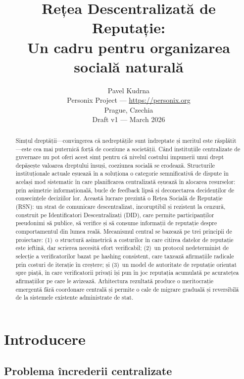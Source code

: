 \documentclass[11pt,a4paper,twocolumn]{article}
\title{\textbf{Rețea Descentralizată de Reputație:\\Un cadru pentru organizarea socială naturală}}
\author{Pavel Kudrna\\Personix Project --- \url{https://personix.org}\\Prague, Czechia\\Draft v1 --- March 2026}
\date{}
\begin{document}
\maketitle

\begin{abstract}
Simțul dreptății---convingerea că nedreptățile sunt îndreptate și meritul este răsplătit---este cea mai puternică forță de coeziune a societății. Când instituțiile centralizate de guvernare nu pot oferi acest simț pentru că nivelul costului impunerii unui drept depășește valoarea dreptului însuși, coeziunea socială se erodează. Structurile instituționale actuale eșuează în a soluționa o categorie semnificativă de dispute în același mod sistematic în care planificarea centralizată eșuează în alocarea resurselor: prin asimetrie informațională, bucle de feedback lipsă și deconectarea decidenților de consecințele deciziilor lor. Această lucrare prezintă o Rețea Socială de Reputație (RSN): un strat de comunicare descentralizat, incoruptibil și rezistent la cenzură, construit pe Identificatori Descentralizați (DID), care permite participanților pseudonimi să publice, să verifice și să consume informații de reputație despre comportamentul din lumea reală. Mecanismul central se bazează pe trei principii de proiectare: (1)~o structură asimetrică a costurilor în care citirea datelor de reputație este ieftină, dar scrierea necesită efort verificabil; (2)~un protocol nedeterminist de selecție a verificatorilor bazat pe hashing consistent, care taxează afirmațiile radicale prin costuri de iterație în creștere; și (3)~un model de autoritate de reputație orientat spre piață, în care verificatorii privați își pun în joc reputația acumulată pe acuratețea afirmațiilor pe care le avizează. Arhitectura rezultată produce o meritocrație emergentă fără coordonare centrală și permite o cale de migrare graduală și reversibilă de la sistemele existente administrate de stat.
\end{abstract}

\section{Introducere}

\subsection{Problema încrederii centralizate}
\end{document}

